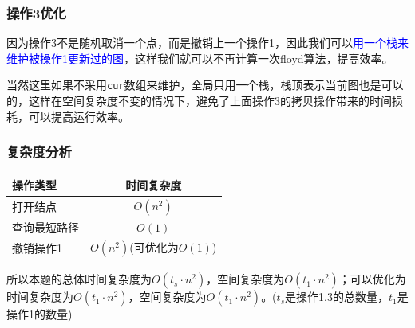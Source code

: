 \documentclass[../mainReport.tex]{subfiles} %
\begin{document}
\subsubsection{操作3优化}

因为操作3不是随机取消一个点，而是撤销上一个操作1，因此我们可以\textcolor{blue}{用一个栈来维护被操作1更新过的图}，这样我们就可以不再计算一次floyd算法，提高效率。

当然这里如果不采用\verb|cur|数组来维护，全局只用一个栈，栈顶表示当前图也是可以的，这样在空间复杂度不变的情况下，避免了上面操作3的拷贝操作带来的时间损耗，可以提高运行效率。



\subsubsection{复杂度分析}

\begin{table}[h]
\centering
\begin{tabular}{|l|c|}
\hline
操作类型 & 时间复杂度 \\
\hline
打开结点 & $O(n^2)$ \\
查询最短路径 & $O(1)$ \\
撤销操作1 & $O(n^2)$(可优化为$O(1)$) \\
\hline
\end{tabular}
\end{table}

所以本题的总体时间复杂度为$O(t_s\cdot n^2)$，空间复杂度为$O(t_1\cdot n^2)$；可以优化为时间复杂度为$O(t_1\cdot n^2)$，空间复杂度为$O(t_1\cdot n^2)$。($t_s$是操作1,3的总数量，$t_1$是操作1的数量)
\end{document}

